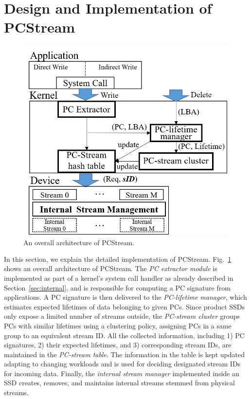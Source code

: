 \section{Design and Implementation of \textsf{PCStream}}

\begin{figure}[t]
	\centering
	\includegraphics[width=0.8\linewidth]{figure/overview}
	\caption{
		An overall architecture of \textsf{\small PCStream}. 
	}
	\label{fig:architecture}
\end{figure}


In this section, we explain the detailed implementation of \textsf{\small
PCStream}.  Fig.~\ref{fig:architecture} shows an overall architecture of
\textsf{\small PCStream}. The \textit{PC extractor module} is implemented as
part of a kernel's system call handler as already described in
Section~\ref{sec:internal}, and is responsible for computing a PC signature
from applications.  A PC signature is then delivered to the \textit{PC-lifetime
manager}, which estimates expected lifetimes of data belonging to given PCs.
Since product SSDs only expose a limited number of streams outside, the
\textit{PC-stream cluster} groups PCs with similar lifetimes using a clustering
policy, assigning PCs in a same group to an equivalent stream ID.  All the
collected information, including 1) PC signatures, 2) their expected lifetimes, and 3)
corresponding stream IDs, are maintained in the \textit{PC-stream table}.  The
information in the table is kept updated adapting to changing workloads and is
used for deciding designated stream IDs for incoming data. Finally, the
\textit{internal stream manager} implemented inside an SSD creates, removes,
and maintains internal streams stemmed from physical streams.

